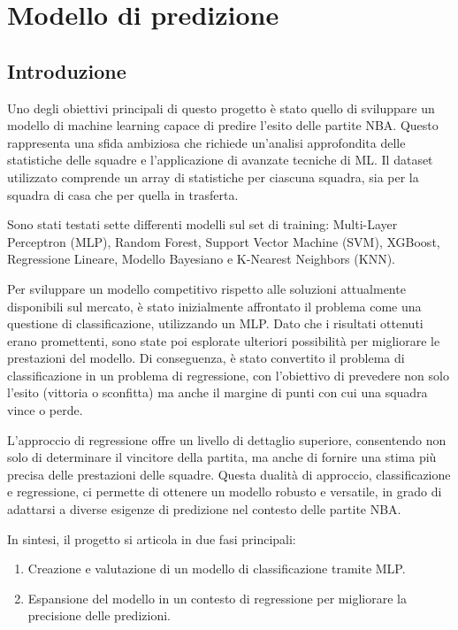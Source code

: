 \section{Modello di predizione}
\subsection{Introduzione}
Uno degli obiettivi principali di questo progetto è stato quello di sviluppare un modello di machine learning capace di predire l'esito delle partite NBA. Questo rappresenta una sfida ambiziosa che richiede un'analisi approfondita delle statistiche delle squadre e l'applicazione di avanzate tecniche di ML. Il dataset utilizzato comprende un array di statistiche per ciascuna squadra, sia per la squadra di casa che per quella in trasferta.

Sono stati testati sette differenti modelli sul set di training: Multi-Layer Perceptron (MLP), Random Forest, Support Vector Machine (SVM), XGBoost, Regressione Lineare, Modello Bayesiano e K-Nearest Neighbors (KNN).


Per sviluppare un modello competitivo rispetto alle soluzioni attualmente disponibili sul mercato, è stato inizialmente affrontato il problema come una questione di classificazione, utilizzando un MLP. Dato che i risultati ottenuti erano promettenti, sono state poi esplorate ulteriori possibilità per migliorare le prestazioni del modello. Di conseguenza, è stato convertito il problema di classificazione in un problema di regressione, con l'obiettivo di prevedere non solo l'esito (vittoria o sconfitta) ma anche il margine di punti con cui una squadra vince o perde.

L'approccio di regressione offre un livello di dettaglio superiore, consentendo non solo di determinare il vincitore della partita, ma anche di fornire una stima più precisa delle prestazioni delle squadre. Questa dualità di approccio, classificazione e regressione, ci permette di ottenere un modello robusto e versatile, in grado di adattarsi a diverse esigenze di predizione nel contesto delle partite NBA.

In sintesi, il progetto si articola in due fasi principali:
\begin{enumerate}
    \item Creazione e valutazione di un modello di classificazione tramite MLP.
    \item Espansione del modello in un contesto di regressione per migliorare la precisione delle predizioni.
\end{enumerate}

